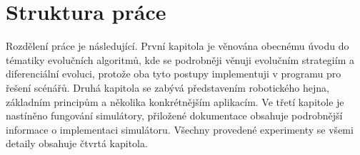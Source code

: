 \section*{Struktura práce}
Rozdělení práce je následující. První kapitola je věnována obecnému úvodu do tématiky evolučních algoritmů, kde se podrobněji věnuji evolučním strategiím a diferenciální evoluci, protože oba tyto postupy implementuji v programu pro řešení scénářů. Druhá kapitola se zabývá představením robotického hejna, základním principům a několika konkrétnějším aplikacím. Ve třetí kapitole je nastíněno fungování simulátory, přiložené dokumentace obsahuje podrobnější informace o implementaci simulátoru. Všechny provedené experimenty se všemi detaily obsahuje čtvrtá kapitola.